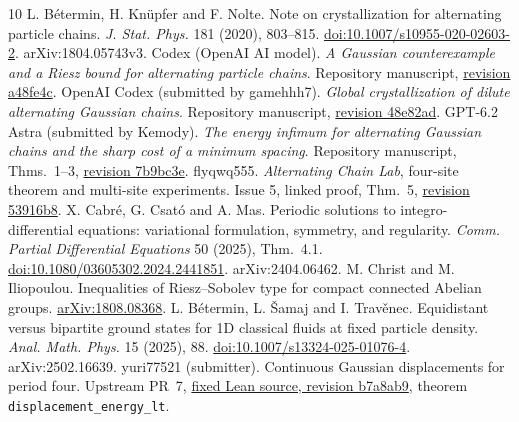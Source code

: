 \begingroup
\small
\begin{thebibliography}{10}
\setlength{\itemsep}{2pt}
 L. Bétermin, H. Knüpfer and F. Nolte. Note on crystallization for alternating particle chains. \emph{J. Stat. Phys.} 181 (2020), 803--815. \href{https://doi.org/10.1007/s10955-020-02603-2}{doi:10.1007/s10955-020-02603-2}. arXiv:1804.05743v3.
 Codex (OpenAI AI model). \emph{A Gaussian counterexample and a Riesz bound for alternating particle chains}. Repository manuscript, \href{https://github.com/xiujiang4/alternating-particle-chains/tree/a48fe4c2623a29dd45edd227410a07baba400250}{revision a48fe4c}.
 OpenAI Codex (submitted by gamehhh7). \emph{Global crystallization of dilute alternating Gaussian chains}. Repository manuscript, \href{https://github.com/xiujiang4/alternating-particle-chains/tree/48e82ad03f1b5f30d6c051b439622cd0bbaf7def}{revision 48e82ad}.
 GPT-6.2 Astra (submitted by Kemody). \emph{The energy infimum for alternating Gaussian chains and the sharp cost of a minimum spacing}. Repository manuscript, Thms.~1--3, \href{https://github.com/Kemody/alternating-particle-chains/blob/7b9bc3e1b13d398a1bf54ab340c18cd3c8f3c88c/en/gaussian-infimum.md}{revision 7b9bc3e}.
 flyqwq555. \emph{Alternating Chain Lab}, four-site theorem and multi-site experiments. Issue 5, linked proof, Thm.~5, \href{https://github.com/flyqwq555/alternating-chain-lab/tree/53916b8d45785aebaf0059836a3064e80e34f107}{revision 53916b8}.
 X. Cabré, G. Csató and A. Mas. Periodic solutions to integro-differential equations: variational formulation, symmetry, and regularity. \emph{Comm. Partial Differential Equations} 50 (2025), Thm.~4.1. \href{https://doi.org/10.1080/03605302.2024.2441851}{doi:10.1080/03605302.2024.2441851}. arXiv:2404.06462.
 M. Christ and M. Iliopoulou. Inequalities of Riesz--Sobolev type for compact connected Abelian groups. \href{https://arxiv.org/abs/1808.08368}{arXiv:1808.08368}.
 L. Bétermin, L. Šamaj and I. Travěnec. Equidistant versus bipartite ground states for 1D classical fluids at fixed particle density. \emph{Anal. Math. Phys.} 15 (2025), 88. \href{https://doi.org/10.1007/s13324-025-01076-4}{doi:10.1007/s13324-025-01076-4}. arXiv:2502.16639.
 yuri77521 (submitter). Continuous Gaussian displacements for period four. Upstream PR~7, \href{https://github.com/yuri77521/alternating-particle-chains/blob/b7a8ab94064559b8430b6a56749d6f5a1e97d8ef/lean/GaussianDisplacementEnergy.lean}{fixed Lean source, revision b7a8ab9}, theorem \texttt{displacement\_energy\_lt}.
\end{thebibliography}
\endgroup

